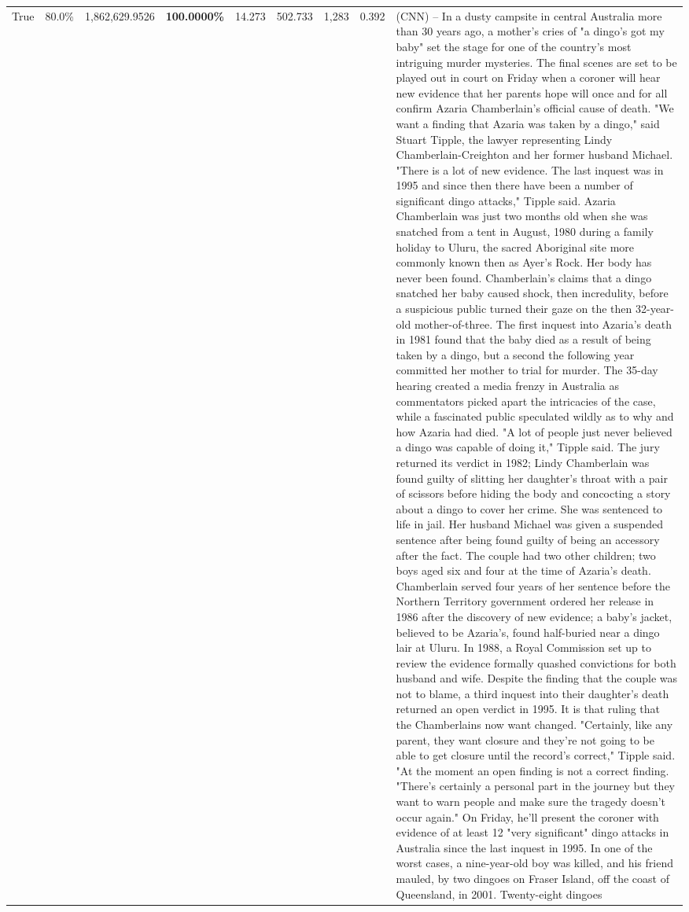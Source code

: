 \begin{table}[H]
\begin{tabular}{lllrlllll}
True & 80.0\% & 1,862,629.9526 & \bfseries \color{red} 100.0000\% & 14.273 & 502.733 & 1,283 & 0.392 & (CNN) -- In a dusty campsite in central Australia more than 30 years ago, a mother's cries of "a dingo's got my baby" set the stage for one of the country's most intriguing murder mysteries. The final scenes are set to be played out in court on Friday when a coroner will hear new evidence that her parents hope will once and for all confirm Azaria Chamberlain's official cause of death. "We want a finding that Azaria was taken by a dingo," said Stuart Tipple, the lawyer representing Lindy Chamberlain-Creighton and her former husband Michael. "There is a lot of new evidence. The last inquest was in 1995 and since then there have been a number of significant dingo attacks," Tipple said. Azaria Chamberlain was just two months old when she was snatched from a tent in August, 1980 during a family holiday to Uluru, the sacred Aboriginal site more commonly known then as Ayer's Rock. Her body has never been found. Chamberlain's claims that a dingo snatched her baby caused shock, then incredulity, before a suspicious public turned their gaze on the then 32-year-old mother-of-three. The first inquest into Azaria's death in 1981 found that the baby died as a result of being taken by a dingo, but a second the following year committed her mother to trial for murder. The 35-day hearing created a media frenzy in Australia as commentators picked apart the intricacies of the case, while a fascinated public speculated wildly as to why and how Azaria had died. "A lot of people just never believed a dingo was capable of doing it," Tipple said. The jury returned its verdict in 1982; Lindy Chamberlain was found guilty of slitting her daughter's throat with a pair of scissors before hiding the body and concocting a story about a dingo to cover her crime. She was sentenced to life in jail. Her husband Michael was given a suspended sentence after being found guilty of being an accessory after the fact. The couple had two other children; two boys aged six and four at the time of Azaria's death. Chamberlain served four years of her sentence before the Northern Territory government ordered her release in 1986 after the discovery of new evidence; a baby's jacket, believed to be Azaria's, found half-buried near a dingo lair at Uluru. In 1988, a Royal Commission set up to review the evidence formally quashed convictions for both husband and wife. Despite the finding that the couple was not to blame, a third inquest into their daughter's death returned an open verdict in 1995. It is that ruling that the Chamberlains now want changed. "Certainly, like any parent, they want closure and they're not going to be able to get closure until the record's correct," Tipple said. "At the moment an open finding is not a correct finding. "There's certainly a personal part in the journey but they want to warn people and make sure the tragedy doesn't occur again." On Friday, he'll present the coroner with evidence of at least 12 "very significant" dingo attacks in Australia since the last inquest in 1995. In one of the worst cases, a nine-year-old boy was killed, and his friend mauled, by two dingoes on Fraser Island, off the coast of Queensland, in 2001. Twenty-eight dingoes 
\end{tabular}
\end{table}
